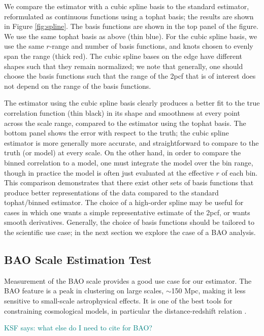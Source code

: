 \documentclass[modern]{aastex62}
\newcommand{\cf}{2pcf\xspace} %
\newcommand{\KSF}[1]{\textcolor{teal}{KSF says: #1}}
\begin{document}
We compare the estimator with a cubic spline basis to the standard estimator, reformulated as continuous functions using a tophat basis; the results are shown in Figure \ref{fig:spline}.
The basis functions are shown in the top panel of the figure.
We use the same tophat basis as above (thin blue).
For the cubic spline basis, we use the same $r$-range and number of basis functions, and knots chosen to evenly span the range (thick red). 
The cubic spline bases on the edge have different shapes such that they remain normalized; we note that generally, one should choose the basis functions such that the range of the \cf that is of interest does not depend on the range of the basis functions.

The estimator using the cubic spline basis clearly produces a better fit to the true correlation function (thin black) in its shape and smoothness at every point across the scale range, compared to the estimator using the tophat basis.
The bottom panel shows the error with respect to the truth; the cubic spline estimator is more generally more accurate, and straightforward to compare to the truth (or model) at every scale.
On the other hand, in order to compare the binned correlation to a model, one must integrate the model over the bin range, though in practice the model is often just evaluated at the effective $r$ of each bin.
This comparison demonstrates that there exist other sets of basis functions that produce better representations of the data compared to the standard tophat/binned estimator.
The choice of a high-order spline may be useful for cases in which one wants a simple representative estimate of the \cf, or wants smooth derivatives.
Generally, the choice of basis functions should be tailored to the scientific use case; in the next section we explore the case of a BAO analysis.


\subsection{BAO Scale Estimation Test}
\label{sec:bao}

Measurement of the BAO scale provides a good use case for our estimator.
The BAO feature is a peak in clustering on large scales, $\sim$150 Mpc, making it less sensitive to small-scale astrophysical effects.
It is one of the best tools for constraining cosmological models, in particular the distance-redshift relation \citep{Kazin2010, Anderson2012, Anderson2014, Alam2016}.

\KSF{what else do I need to cite for BAO?}
\end{document}
